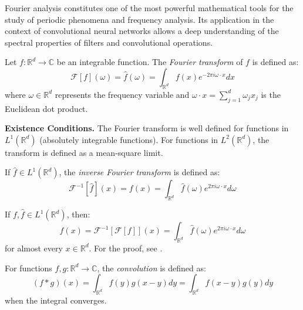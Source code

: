 Fourier analysis constitutes one of the most powerful mathematical tools for the study of periodic phenomena and frequency analysis. Its application in the context of convolutional neural networks allows a deep understanding of the spectral properties of filters and convolutional operations.

\begin{definition}\label{def:transformada_fourier_continua}
Let $f: \mathbb{R}^d \to \mathbb{C}$ be an integrable function. The \textit{Fourier transform} of $f$ is defined as:
\begin{equation}
\mathcal{F}[f](\omega) = \hat{f}(\omega) = \int_{\mathbb{R}^d} f(x) e^{-2\pi i \omega \cdot x} dx
\end{equation}
where $\omega \in \mathbb{R}^d$ represents the frequency variable and $\omega \cdot x = \sum_{j=1}^d \omega_j x_j$ is the Euclidean dot product.
\end{definition}

\textbf{Existence Conditions.} The Fourier transform is well defined for functions in $L^1(\mathbb{R}^d)$ (absolutely integrable functions). For functions in $L^2(\mathbb{R}^d)$, the transform is defined as a mean-square limit.

\begin{definition}\label{def:transformada_fourier_inversa}
If $\hat{f} \in L^1(\mathbb{R}^d)$, the \textit{inverse Fourier transform} is defined as:
\begin{equation}
\mathcal{F}^{-1}[\hat{f}](x) = f(x) = \int_{\mathbb{R}^d} \hat{f}(\omega) e^{2\pi i \omega \cdot x} d\omega
\end{equation}
\end{definition}

\begin{theorem}\label{thm:inversion_fourier}
If $f, \hat{f} \in L^1(\mathbb{R}^d)$, then:
\begin{equation}
f(x) = \mathcal{F}^{-1}[\mathcal{F}[f]](x) = \int_{\mathbb{R}^d} \hat{f}(\omega) e^{2\pi i \omega \cdot x} d\omega
\end{equation}
for almost every $x \in \mathbb{R}^d$. For the proof, see \citep[Theorem~8.26]{Folland1999}.
\end{theorem}

\begin{definition}\label{def:convolucion_continua}
For functions $f, g: \mathbb{R}^d \to \mathbb{C}$, the \textit{convolution} is defined as:
\begin{equation}
(f * g)(x) = \int_{\mathbb{R}^d} f(y) g(x - y) dy = \int_{\mathbb{R}^d} f(x - y) g(y) dy
\end{equation}
when the integral converges.
\end{definition}

